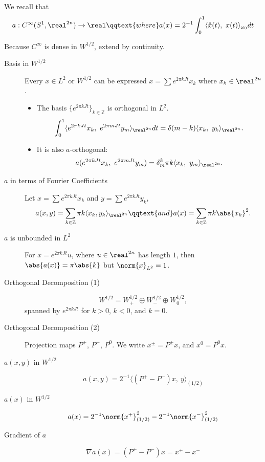 \documentclass[../main-v2-manifolds.tex]{subfiles}
\begin{document}
We recall that 
\[
    a: C^\infty(S^1,\realtn)\to\real\qqtext{where} a(x) = 2^{-1}\int_0^1 \langle \mathring{x}(t),\ x(t)\rangle_{\omega_0}dt
\]
\begin{wts}[Extend $a$ to $W^{1/2}$]
    Because $C^\infty$ is dense in $W^{1/2}$, extend by continuity.
\end{wts}
\begin{description}
\item[Basis in $W^{1/2}$]
    Every $x\in L^2$ or $W^{1/2}$ can be expressed $x = \sum e^{2\pi k J t}x_k$ where $x_k\in\realtn$. 
    \begin{itemize}
        \item The basis $\{e^{2\pi k J t}\}_{k\in\mathbb{Z}}$ is orthogonal in $L^2$. 
        \[
            \int_0^1 \langle e^{2\pi kJ t}x_k,\ e^{2\pi m J t}y_m\rangle_{\realtn} dt = \delta(m-k)\langle x_k,\ y_k\rangle_{\realtn}.
        \]    
        \item It is also $a$-orthogonal:
        \[
            a(e^{2\pi kJ t}x_k,\  e^{2\pi mJ t}y_m) = \delta_m^k\pi k\langle x_k,\ y_m\rangle_{\realtn}.
        \]
    \end{itemize}
\item[$a$ in terms of Fourier Coefficients]
    Let $x = \sum e^{2\pi k J t}x_k$ and $y = \sum e^{2\pi k J t}y_k$, 
    \[
        a(x,y) = \sum_{k\in\mathbb{Z}}\pi k\langle x_k, y_k \rangle_{\realtn}\qqtext{and}a(x) = \sum_{k\in\mathbb{Z}}\pi k\abs{x_k}^2.
    \]
\item[$a$ is unbounded in $L^2$]
    For $x = e^{2\pi k J t}u$, where $u\in\realtn$ has length $1$, then $ \abs{a(x)} = \pi \abs{k}$ but $\norm{x}_{L^2} = 1$.
\item[Orthogonal Decomposition (1)]
    \[
    W^{1/2} = W^{1/2}_{+}\oplus W^{1/2}_{-} \oplus W^{1/2}_{0},
    \]
    spanned by $e^{2\pi kJ t}$ for $k>0$, $k<0$, and $k=0$. 
    \item[Orthogonal Decomposition (2)] Projection maps $P^{+}$, $P^-$, $P^0$. We write $x^{\pm} = P^{\pm}x$, and $x^0 = P^0 x$.
    \item[$a(x,y)$ in $W^{1/2}$] 
        \[
        a(x,y) = 2^{-1}\langle (P^+ - P^-)x,\ y\rangle_{(1/2)}
        \]
    \item[$a(x)$ in $W^{1/2}$]
        \[
        a(x) = 2^{-1}\norm{x^+}_{(1/2)}^2 - 2^{-1}\norm{x^-}^2_{(1/2)}
        \]
    \item[Gradient of $a$]
        \[\nabla a(x) = (P^+ - P^-)x = x^+ - x^-\]
\end{description}
\end{document}
